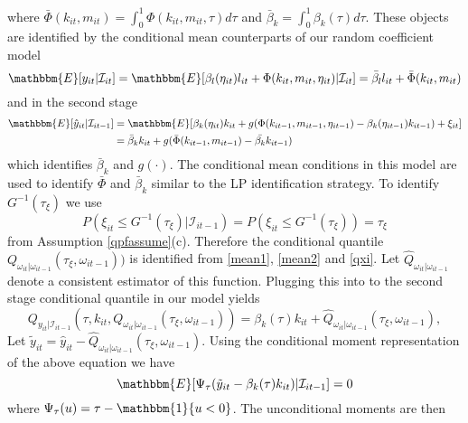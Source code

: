 \documentclass[11pt]{article}
\begin{document}
where $\bar{\Phi}(k_{it}, m_{it})=\int_{0}^{1}\Phi(k_{it}, m_{it}, \tau)d\tau$ and $\bar{\beta}_{k}=\int_{0}^{1}\beta_{k}(\tau)d\tau$. These objects are identified by the conditional mean counterparts of our random coefficient model
\begin{equation}\label{mean1}
\mathbbm{E}[y_{it}|\mathcal{I}_{it}]=\mathbbm{E}[\beta_{l}(\eta_{it})l_{it}+\Phi(k_{it}, m_{it}, \eta_{it})|\mathcal{I}_{it}]=\bar{\beta}_{l}l_{it}+\bar{\Phi}(k_{it}, m_{it})
\end{equation}
and in the second stage
\begin{equation}\label{mean2}
\begin{split}
\mathbbm{E}[\hat{y}_{it}|\mathcal{I}_{it-1}]&=\mathbbm{E}[\beta_{k}(\eta_{it})k_{it}+g(\Phi(k_{it-1}, m_{it-1}, \eta_{it-1})-\beta_{k}(\eta_{it-1})k_{it-1})+\xi_{it}]\\
&=\bar{\beta}_{k}k_{it}+g(\bar{\Phi}(k_{it-1}, m_{it-1})-\bar{\beta_{k}}k_{it-1})
\end{split}
\end{equation}
which identifies $\bar{\beta}_{k}$ and $g(\cdot)$. The conditional mean conditions in this model are used to identify $\bar{\Phi}$ and $\bar{\beta}_{k}$ similar to the LP identification strategy. To identify $G^{-1}(\tau_{\xi})$ we use
\begin{equation}\label{qxi}
P(\xi_{it}\leq G^{-1}(\tau_{\xi})|\mathcal{I}_{it-1})=P(\xi_{it}\leq G^{-1}(\tau_{\xi}))=\tau_{\xi}
\end{equation}
from Assumption \eqref{qpfassume}(c). Therefore the conditional quantile $ Q_{\omega_{it}|\omega_{it-1}}(\tau_{\xi}, \omega_{it-1}))$ is identified from \eqref{mean1}, \eqref{mean2} and \eqref{qxi}. Let $\hat{Q}_{\omega_{it}|\omega_{it-1}}$ denote a consistent estimator of this function. Plugging this into to the second stage conditional quantile in our model yields
\begin{equation*}
Q_{y_{it}|\mathcal{I}_{it-1}}(\tau, k_{it}, Q_{\omega_{it}|\omega_{it-1}}(\tau_{\xi}, \omega_{it-1}))=\beta_{k}(\tau)k_{it}+\hat{Q}_{\omega_{it}|\omega_{it-1}}(\tau_{\xi}, \omega_{it-1}),
\end{equation*}
Let $\tilde{y}_{it}=\hat{y}_{it}-\hat{Q}_{\omega_{it}|\omega_{it-1}}(\tau_{\xi}, \omega_{it-1})$. Using the conditional moment representation of the above equation we have
\begin{equation}
\mathbbm{E}[\Psi_{\tau}(\tilde{y}_{it}-\beta_{k}(\tau)k_{it})|\mathcal{I}_{it-1}]=0
\end{equation}
where $\Psi_{\tau}(u)=\tau-\mathbbm{1}\{u<0\}$. The unconditional moments are then
\end{document}
